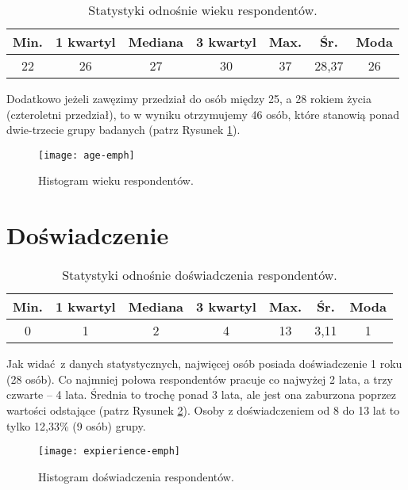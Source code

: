 \begin{table}[h!]
\begin{center}
\begin{tabular}{c c c c c c c}
Min. & 1 kwartyl & Mediana & 3 kwartyl & Max. & Śr. & Moda \\ \hline
22 & 26 & 27 & 30 & 37 & 28,37 & 26 \\
\end{tabular}
\end{center}
\caption{Statystyki odnośnie wieku respondentów.}
\label{tab:age-stats}
\end{table}

Dodatkowo jeżeli zawęzimy przedział do osób między 25, a 28 rokiem życia (czteroletni przedział), to w wyniku otrzymujemy 46 osób, które stanowią ponad dwie-trzecie grupy badanych (patrz Rysunek \ref{fig:age}).

\begin{figure}[h]
\begin{center}
\texttt{[image: age-emph]}
\end{center}
\caption{Histogram wieku respondentów.}
\label{fig:age}
\end{figure}

\section{Doświadczenie}
\label{sec:group-exp}

\begin{table}[h!]
\begin{center}
\begin{tabular}{c c c c c c c}
Min. & 1 kwartyl & Mediana & 3 kwartyl & Max. & Śr. & Moda \\ \hline
0 & 1 & 2 & 4 & 13 & 3,11 & 1 \\
\end{tabular}
\end{center}
\caption{Statystyki odnośnie doświadczenia respondentów.}
\label{tab:expierience-stats}
\end{table}

Jak widać z danych statystycznych, najwięcej osób posiada doświadczenie 1 roku (28 osób). Co najmniej połowa respondentów pracuje co najwyżej 2 lata, a trzy czwarte -- 4 lata. Średnia to trochę ponad 3 lata, ale jest ona zaburzona poprzez wartości odstające (patrz Rysunek \ref{fig:expierience}). Osoby z doświadczeniem od 8 do 13 lat to tylko 12,33\% (9 osób) grupy.

\begin{figure}[h]
\begin{center}
\texttt{[image: expierience-emph]}
\end{center}
\caption{Histogram doświadczenia respondentów.}
\label{fig:expierience}
\end{figure}

